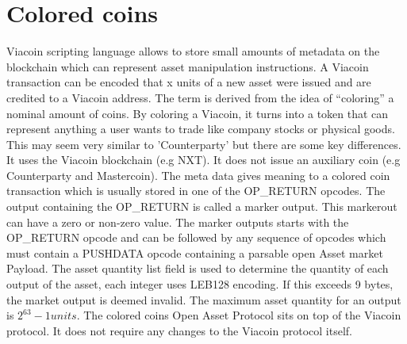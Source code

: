 \documentclass{article}
\begin{document}
\section{Colored coins}\label{Colored coins}
Viacoin scripting language allows to store small amounts of metadata on the
blockchain which can represent asset manipulation instructions. A Viacoin
transaction can be encoded that x units of a new asset were issued and are
credited to a Viacoin address. The term is derived from the idea of “coloring” a
nominal amount of coins.
By coloring a Viacoin, it turns into a token that can represent anything a user
wants to trade like company stocks or physical goods. This may seem very similar to
'Counterparty' but there are some key differences. It uses the Viacoin blockchain
(e.g NXT).
\newline \newline \noindent
It does not issue an auxiliary coin (e.g Counterparty and Mastercoin).
The meta data gives meaning to a \cite{coloredCoins}colored coin transaction which is usually stored
in one of the OP\_RETURN opcodes. The output containing the OP\_RETURN is called
a marker output. This markerout can have a zero or non-zero value. The marker
outputs starts with the OP\_RETURN opcode and can be followed by any sequence
of opcodes which must contain a PUSHDATA opcode containing a parsable open
Asset market Payload.
The asset quantity list field is used to determine the quantity of each output of
the asset, each integer uses LEB128 encoding. If this exceeds 9 bytes, the
market output is deemed invalid. The maximum asset quantity for an output is
$2^63 - 1 units$.
The colored coins \cite{openAsset}Open Asset Protocol sits on top of the Viacoin protocol. It does
not require any changes to the Viacoin protocol itself.
\end{document}
